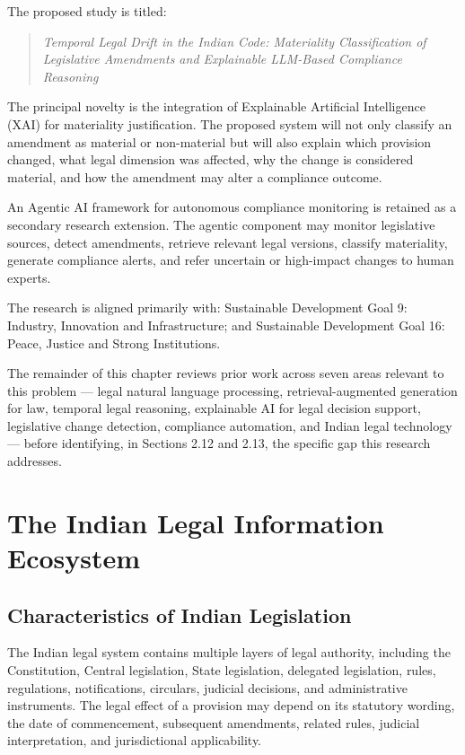 The proposed study is titled:

\begin{quote}\itshape Temporal Legal Drift in the Indian Code: Materiality Classification of Legislative Amendments and Explainable LLM-Based Compliance Reasoning\end{quote}

The principal novelty is the integration of Explainable Artificial Intelligence (XAI) for materiality justification. The proposed system will not only classify an amendment as material or non-material but will also explain which provision changed, what legal dimension was affected, why the change is considered material, and how the amendment may alter a compliance outcome.

An Agentic AI framework for autonomous compliance monitoring is retained as a secondary research extension. The agentic component may monitor legislative sources, detect amendments, retrieve relevant legal versions, classify materiality, generate compliance alerts, and refer uncertain or high-impact changes to human experts.

The research is aligned primarily with: Sustainable Development Goal 9: Industry, Innovation and Infrastructure; and Sustainable Development Goal 16: Peace, Justice and Strong Institutions.

The remainder of this chapter reviews prior work across seven areas relevant to this problem — legal natural language processing, retrieval-augmented generation for law, temporal legal reasoning, explainable AI for legal decision support, legislative change detection, compliance automation, and Indian legal technology — before identifying, in Sections 2.12 and 2.13, the specific gap this research addresses.

\section{The Indian Legal Information Ecosystem}

\label{sec:2-2}

\subsection{Characteristics of Indian Legislation}

\label{sec:2-2-1}

The Indian legal system contains multiple layers of legal authority, including the Constitution, Central legislation, State legislation, delegated legislation, rules, regulations, notifications, circulars, judicial decisions, and administrative instruments. The legal effect of a provision may depend on its statutory wording, the date of commencement, subsequent amendments, related rules, judicial interpretation, and jurisdictional applicability.

